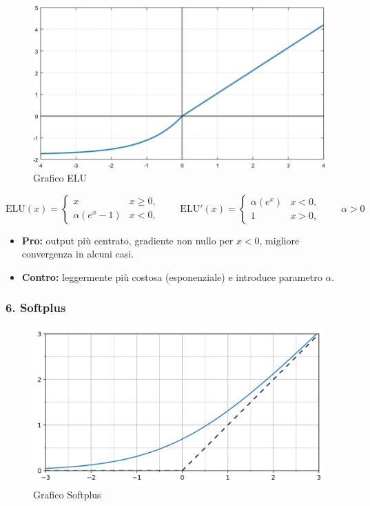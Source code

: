 \documentclass[a4paper,12pt]{report}
\begin{document}
	\begin{figure}[H]
		\centering
		\includegraphics[width=1.0\textwidth]{img/elu.png}
		\caption{Grafico ELU}
	\end{figure}
	
	\[
	\mathrm{ELU}(x)=\begin{cases}x & x\ge0,\\ \alpha(e^x-1) & x<0,\end{cases}\qquad
	\mathrm{ELU}'(x)=\begin{cases}\alpha(e^x) & x<0,\\ 1 & x>0,\end{cases}\qquad \alpha>0
	\]
	\begin{itemize}
		\item \textbf{Pro:} output più centrato, gradiente non nullo per $x<0$, migliore convergenza in alcuni casi.
		\item \textbf{Contro:} leggermente più costosa (esponenziale) e introduce parametro $\alpha$.
	\end{itemize}
	
	\subsubsection{6. Softplus}
	
	\begin{figure}[H]
		\centering
		\includegraphics[width=1.0\textwidth]{img/softplus.png}
		\caption{Grafico Softplus}
	\end{figure}
	
\end{document}
